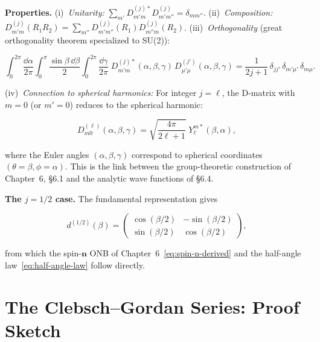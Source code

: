 \medskip\noindent\textbf{Properties.} (i)~\emph{Unitarity:} $\sum_{m'} D^{(j)*}_{m'm} D^{(j)}_{m'm''} = \delta_{mm''}$. (ii)~\emph{Composition:} $D^{(j)}_{m'm}(R_1 R_2) = \sum_{m''} D^{(j)}_{m'm''}(R_1) D^{(j)}_{m''m}(R_2)$. (iii)~\emph{Orthogonality} (great orthogonality theorem specialized to SU(2)):
\begin{linenomath}
    \begin{equation}
        \int_0^{2\pi}\!\frac{\dd\alpha}{2\pi}\int_0^\pi\!\frac{\sin\beta\,\dd\beta}{2}\int_0^{2\pi}\!\frac{\dd\gamma}{2\pi}\; D^{(j)*}_{m'm}(\alpha,\beta,\gamma)\,D^{(j')}_{\mu'\mu}(\alpha,\beta,\gamma) = \frac{1}{2j+1}\,\delta_{jj'}\,\delta_{m'\mu'}\,\delta_{m\mu}.
        \label{eq:D-orthogonality}
    \end{equation}
\end{linenomath}
(iv)~\emph{Connection to spherical harmonics:} For integer $j = \ell$, the D-matrix with $m = 0$ (or $m' = 0$) reduces to the spherical harmonic:
\begin{linenomath}
    \begin{equation}
        D^{(\ell)}_{m0}(\alpha,\beta,\gamma) = \sqrt{\frac{4\pi}{2\ell+1}}\;Y_\ell^{m*}(\beta,\alpha),
        \label{eq:D-to-Y}
    \end{equation}
\end{linenomath}
where the Euler angles $(\alpha,\beta,\gamma)$ correspond to spherical coordinates $(\theta = \beta, \phi = \alpha)$. This is the link between the group-theoretic construction of Chapter~6, §6.1 and the analytic wave functions of §6.4.

\medskip\noindent\textbf{The $j=1/2$ case.} The fundamental representation gives
\begin{linenomath}
    \begin{equation}
        d^{(1/2)}(\beta) = \begin{pmatrix}
            \cos(\beta/2) & -\sin(\beta/2) \\
            \sin(\beta/2) & \cos(\beta/2)
        \end{pmatrix},
        \label{eq:d-half}
    \end{equation}
\end{linenomath}
from which the spin-$\bm n$ ONB of Chapter~6~\eqref{eq:spin-n-derived} and the half-angle law~\eqref{eq:half-angle-law} follow directly.

\section{The Clebsch--Gordan Series: Proof Sketch}
\label{sec:appendix-cg}

